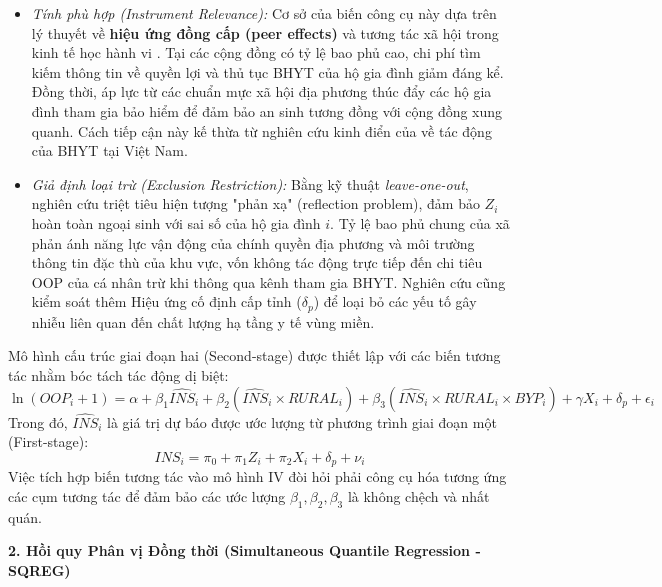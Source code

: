 \documentclass[12pt,a4paper]{article}
\begin{document}
\begin{itemize}
	\item \textit{Tính phù hợp (Instrument Relevance):} Cơ sở của biến công cụ này dựa trên lý thuyết về \textbf{hiệu ứng đồng cấp (peer effects)} và tương tác xã hội trong kinh tế học hành vi \parencite{manski1993}. Tại các cộng đồng có tỷ lệ bao phủ cao, chi phí tìm kiếm thông tin về quyền lợi và thủ tục BHYT của hộ gia đình giảm đáng kể. Đồng thời, áp lực từ các chuẩn mực xã hội địa phương thúc đẩy các hộ gia đình tham gia bảo hiểm để đảm bảo an sinh tương đồng với cộng đồng xung quanh. Cách tiếp cận này kế thừa từ nghiên cứu kinh điển của \textcite{wagstaff2007} về tác động của BHYT tại Việt Nam.
	
	\item \textit{Giả định loại trừ (Exclusion Restriction):} Bằng kỹ thuật \textit{leave-one-out}, nghiên cứu triệt tiêu hiện tượng "phản xạ" (reflection problem), đảm bảo $Z_i$ hoàn toàn ngoại sinh với sai số của hộ gia đình $i$. Tỷ lệ bao phủ chung của xã phản ánh năng lực vận động của chính quyền địa phương và môi trường thông tin đặc thù của khu vực, vốn không tác động trực tiếp đến chi tiêu OOP của cá nhân trừ khi thông qua kênh tham gia BHYT. Nghiên cứu cũng kiểm soát thêm Hiệu ứng cố định cấp tỉnh ($\delta_p$) để loại bỏ các yếu tố gây nhiễu liên quan đến chất lượng hạ tầng y tế vùng miền.
\end{itemize}

Mô hình cấu trúc giai đoạn hai (Second-stage) được thiết lập với các biến tương tác nhằm bóc tách tác động dị biệt:
\begin{equation}
	\ln(OOP_i + 1) = \alpha + \beta_1 \widehat{INS}_i + \beta_2 (\widehat{INS}_i \times RURAL_i) + \beta_3 (\widehat{INS}_i \times RURAL_i \times BYP_i) + \gamma X_i + \delta_p + \epsilon_i
\end{equation}
Trong đó, $\widehat{INS}_i$ là giá trị dự báo được ước lượng từ phương trình giai đoạn một (First-stage):
\begin{equation}
	INS_i = \pi_0 + \pi_1 Z_i + \pi_2 X_i + \delta_p + \nu_i
\end{equation}
Việc tích hợp biến tương tác vào mô hình IV đòi hỏi phải công cụ hóa tương ứng các cụm tương tác để đảm bảo các ước lượng $\beta_1, \beta_2, \beta_3$ là không chệch và nhất quán.

\textbf{2. Hồi quy Phân vị Đồng thời (Simultaneous Quantile Regression - SQREG)}
\end{document}
